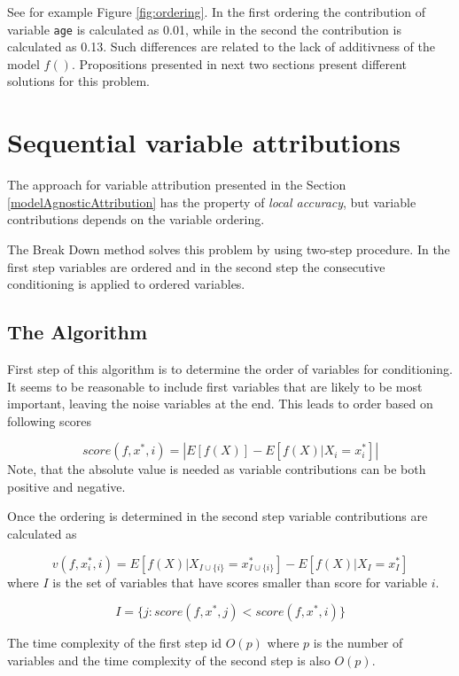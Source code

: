 \documentclass[]{krantz}
\theoremstyle{definition}
\theoremstyle{definition}
\theoremstyle{definition}
\theoremstyle{remark}
\begin{document}
See for example Figure \ref{fig:ordering}. In the first ordering the
contribution of variable \texttt{age} is calculated as 0.01, while in
the second the contribution is calculated as 0.13. Such differences are
related to the lack of additivness of the model \(f()\). Propositions
presented in next two sections present different solutions for this
problem.

\hypertarget{breakDown}{%
\section{Sequential variable attributions}\label{breakDown}}

The approach for variable attribution presented in the Section
\ref{modelAgnosticAttribution} has the property of \emph{local
accuracy}, but variable contributions depends on the variable ordering.

The Break Down method solves this problem by using two-step procedure.
In the first step variables are ordered and in the second step the
consecutive conditioning is applied to ordered variables.

\hypertarget{the-algorithm}{%
\subsection{The Algorithm}\label{the-algorithm}}

First step of this algorithm is to determine the order of variables for
conditioning. It seems to be reasonable to include first variables that
are likely to be most important, leaving the noise variables at the end.
This leads to order based on following scores

\[
score(f, x^*, i) = \left| E [f(X)] - E [f(X)|X_i = x^*_i] \right|
\] Note, that the absolute value is needed as variable contributions can
be both positive and negative.

Once the ordering is determined in the second step variable
contributions are calculated as

\[
v(f, x^*_i, i) = E [f(X) | X_{I \cup \{i\}} = x_{I \cup \{i\}}^*] - E [f(X) | X_{I} = x_{I}^*] 
\] where \(I\) is the set of variables that have scores smaller than
score for variable \(i\).

\[
I = \{j: score(f, x^*, j) < score(f, x^*, i)\}
\]

The time complexity of the first step id \(O(p)\) where \(p\) is the
number of variables and the time complexity of the second step is also
\(O(p)\).
\end{document}
